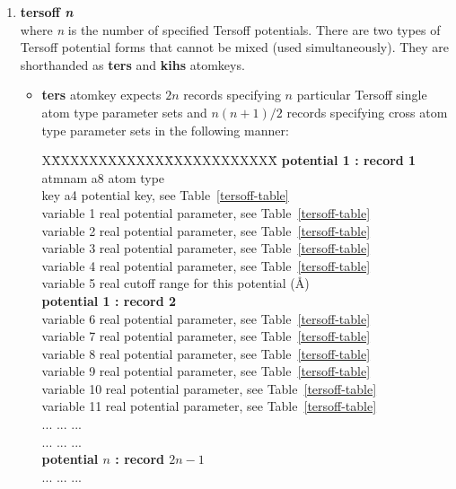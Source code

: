 \begin{enumerate}
\item {\bf tersoff {\em n}} \\
where {\em n} is the number of specified Tersoff potentials.  There
are two types of Tersoff potential forms that cannot be mixed (used
simultaneously).  They are shorthanded as {\bf ters} and {\bf kihs}
atomkeys.
\begin{itemize}
\item {\bf ters} atomkey expects $2n$ records specifying $n$ particular
Tersoff single atom type parameter sets and $n(n+1)/2$ records specifying
cross atom type parameter sets in the following manner:
\begin{tabbing}
X\=XXXXXXXXXXXX\=XXXXXXXXXXXX\=\kill
{\bf potential 1 : record 1} \\
\> atmnam       \> a8   \> atom type \\
\> key          \> a4   \> potential key, see Table~\ref{tersoff-table} \\
\> variable 1   \> real \> potential parameter, see Table~\ref{tersoff-table} \\
\> variable 2   \> real \> potential parameter, see Table~\ref{tersoff-table} \\
\> variable 3   \> real \> potential parameter, see Table~\ref{tersoff-table} \\
\> variable 4   \> real \> potential parameter, see Table~\ref{tersoff-table} \\
\> variable 5   \> real \> cutoff range for this potential (\AA) \\
{\bf potential 1 : record 2} \\
\> variable 6   \> real \> potential parameter, see Table~\ref{tersoff-table} \\
\> variable 7   \> real \> potential parameter, see Table~\ref{tersoff-table} \\
\> variable 8   \> real \> potential parameter, see Table~\ref{tersoff-table} \\
\> variable 9   \> real \> potential parameter, see Table~\ref{tersoff-table} \\
\> variable 10  \> real \> potential parameter, see Table~\ref{tersoff-table} \\
\> variable 11  \> real \> potential parameter, see Table~\ref{tersoff-table} \\
\> ... \> ... \> ... \\
\> ... \> ... \> ... \\
{\bf potential $n$ : record $2n-1$} \\
\> ... \> ... \> ... \\

\end{tabbing}
\end{itemize}
\end{enumerate}
